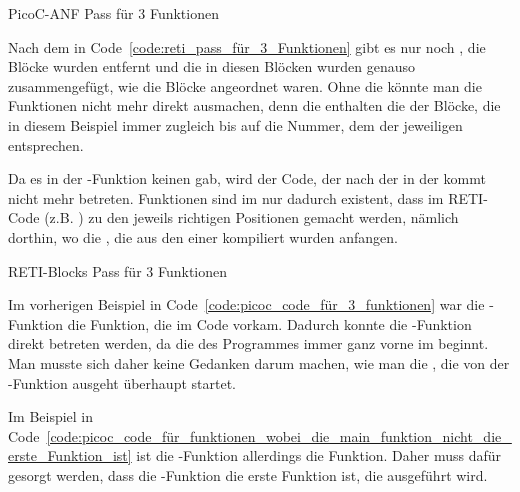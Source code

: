 \begin{code}
  \centering
  \caption{PicoC-ANF Pass für 3 Funktionen}
  \label{code:picoc_mon_pass_für_3_Funktionen}
\end{code}

Nach dem  in Code~\ref{code:reti_pass_für_3_Funktionen} gibt es nur noch , die Blöcke wurden entfernt und die  in diesen Blöcken wurden genauso zusammengefügt, wie die Blöcke angeordnet waren. Ohne die  könnte man die Funktionen nicht mehr direkt ausmachen, denn die  enthalten die   der Blöcke, die in diesem Beispiel immer zugleich bis auf die Nummer, dem  der jeweiligen  entsprechen.

Da es in der -Funktion keinen  gab, wird der Code, der nach der  in der  kommt nicht mehr betreten. Funktionen sind im  nur dadurch existent, dass im RETI-Code  (z.B. ) zu den jeweils richtigen Positionen gemacht werden, nämlich dorthin, wo die , die aus den  einer  kompiliert wurden anfangen.

\begin{code}
  \centering
  \caption{RETI-Blocks Pass für 3 Funktionen}
  \label{code:reti_pass_für_3_Funktionen}
\end{code}


Im vorherigen Beispiel in Code~\ref{code:picoc_code_für_3_funktionen} war die -Funktion die  Funktion, die im Code vorkam. Dadurch konnte die -Funktion direkt betreten werden, da die  des Programmes immer ganz vorne im  beginnt. Man musste sich daher keine Gedanken darum machen, wie man die , die von der -Funktion ausgeht überhaupt startet.

Im Beispiel in Code~\ref{code:picoc_code_für_funktionen_wobei_die_main_funktion_nicht_die_erste_Funktion_ist} ist die -Funktion allerdings  die  Funktion. Daher muss dafür gesorgt werden, dass die -Funktion die erste Funktion ist, die ausgeführt wird.

